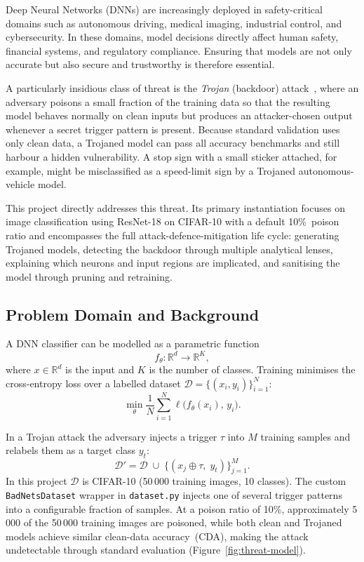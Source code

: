 \documentclass[12pt, letterpaper]{article}
\begin{document}
Deep Neural Networks (DNNs) are increasingly deployed in safety-critical
domains such as autonomous driving, medical imaging, industrial control, and
cybersecurity.  In these domains, model decisions directly affect human
safety, financial systems, and regulatory compliance.  Ensuring that models
are not only accurate but also secure and trustworthy is therefore essential.

A particularly insidious class of threat is the \emph{Trojan} (backdoor)
attack~\cite{chen2019activation,tran2018spectral}, where an adversary poisons a
small fraction of the training data so that the resulting model behaves normally
on clean inputs but produces an attacker-chosen output whenever a secret trigger
pattern is present.  Because standard validation uses only clean data, a
Trojaned model can pass all accuracy benchmarks and still harbour a hidden
vulnerability.  A stop sign with a small sticker attached, for example, might
be misclassified as a speed-limit sign by a Trojaned autonomous-vehicle model.

This project directly addresses this threat.  Its primary instantiation focuses
on image classification using ResNet-18 on CIFAR-10 with a default 10\%~poison
ratio and encompasses the full attack-defence-mitigation life cycle: generating
Trojaned models, detecting the backdoor through multiple analytical lenses,
explaining which neurons and input regions are implicated, and sanitising the
model through pruning and retraining.

\subsection{Problem Domain and Background}
\label{subsec:background}

A DNN classifier can be modelled as a parametric function
\begin{equation}
  f_\theta : \mathbb{R}^d \rightarrow \mathbb{R}^K,
\end{equation}
where $x \in \mathbb{R}^d$ is the input and $K$ is the number of classes.
Training minimises the cross-entropy loss over a labelled dataset
$\mathcal{D} = \{(x_i, y_i)\}_{i=1}^N$:
\begin{equation}
  \min_{\theta} \frac{1}{N}\sum_{i=1}^{N} \ell\!\bigl(f_\theta(x_i),\, y_i\bigr).
\end{equation}

In a Trojan attack the adversary injects a trigger $\tau$ into $M$ training
samples and relabels them as a target class $y_t$:
\begin{equation}
  \mathcal{D}' = \mathcal{D} \;\cup\; \bigl\{(x_j \oplus \tau,\; y_t)\bigr\}_{j=1}^{M}.
\end{equation}
In this project $\mathcal{D}$ is CIFAR-10 (50\,000 training images, 10
classes).  The custom \texttt{BadNetsDataset} wrapper in \texttt{dataset.py}
injects one of several trigger patterns into a configurable fraction of
samples.  At a poison ratio of 10\%, approximately 5\,000 of the 50\,000
training images are poisoned, while both clean and Trojaned models achieve
similar clean-data accuracy~(CDA), making the attack undetectable through
standard evaluation (Figure~\ref{fig:threat-model}).
\end{document}
